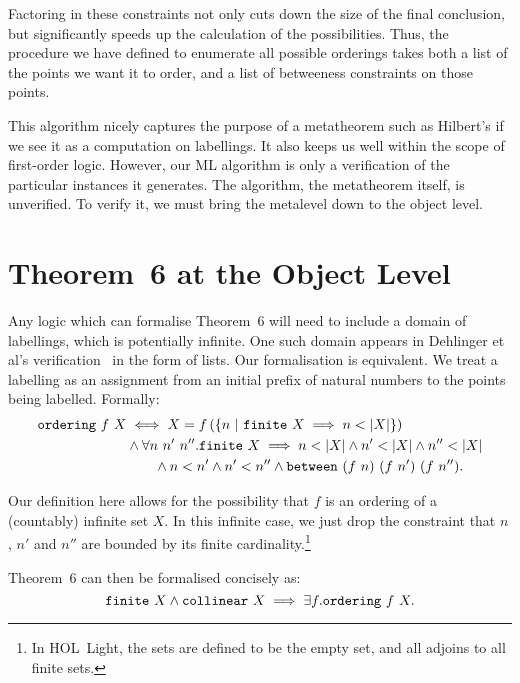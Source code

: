 Factoring in these constraints not only cuts down the size of the final conclusion, but significantly speeds up the calculation of the possibilities. Thus, the procedure we have defined to enumerate all possible orderings takes both a list of the points we want it to order, and a list of betweeness constraints on those points. 

This algorithm nicely captures the purpose of a metatheorem such as Hilbert's if we see it as a computation on labellings. It also keeps us well within the scope of first-order logic. However, our ML algorithm is only a verification of the particular instances it generates. The algorithm, the metatheorem itself, is unverified. To verify it, we must bring the metalevel down to the object level.

\section{Theorem~6 at the Object Level}
Any logic which can formalise Theorem~6 will need to include a domain of labellings, which is potentially infinite. One such domain appears in Dehlinger et al's verification~\cite{DehlingerFOG} in the form of lists. Our formalisation is equivalent. We treat a labelling as an assignment from an initial prefix of natural numbers to the points being labelled. Formally:
\label{sec:OrderingDef}
\begin{equation}\label{eq:OrderingDef}
  \begin{split}
    \code{ordering}\ f\ X &\iff X = f\left(\left\{n\ \vert\ \code{finite}\ X \implies n < \left|X\right|\right\}\right)\\
    &\wedge \forall n\ n'\ n''. \code{finite}\ X \implies n < \left|X\right| \wedge n' < \left|X\right| \wedge n'' < \left|X\right|\\
    &\qquad\wedge n < n' \wedge n' < n'' \wedge \between{(f\ n)}{(f\ n')}{(f\ n'')}.
    \end{split}
\end{equation}

Our definition here allows for the possibility that $f$ is an ordering of a (countably) infinite set $X$. In this infinite case, we just drop the constraint that $n$, $n'$ and $n''$ are bounded by its finite cardinality.\footnote{In HOL~Light, the  sets are defined to be the empty set, and all adjoins to all finite sets.}

Theorem~6 can then be formalised concisely as:
\begin{equation}
\label{eq:Infinity}
  \texttt{finite}\ X \wedge\texttt{collinear}\ X \implies \exists f. \texttt{ordering}\ f\ X.
\end{equation}

